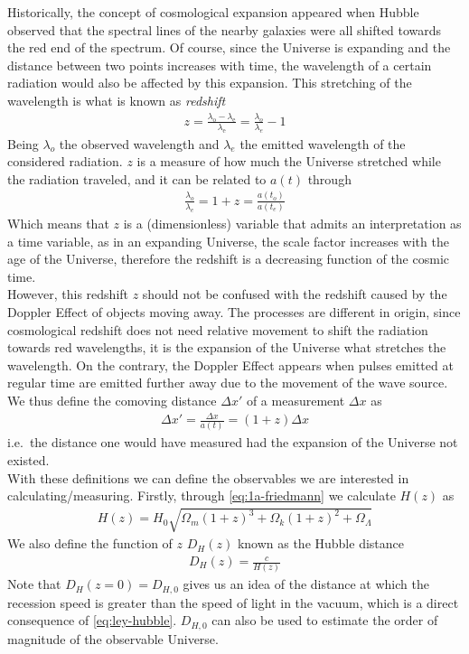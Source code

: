 Historically, the concept of cosmological expansion appeared when Hubble observed that the spectral lines of the nearby galaxies were all shifted towards the red end of the spectrum. Of course, since the Universe is expanding and the distance between two points increases with time, the wavelength of a certain radiation would also be affected by this expansion. This stretching of the wavelength is what is known as \textit{redshift} 
\begin{align}
	z = \frac{\lambda_{\text{o}} - \lambda_{\text{e}}}{\lambda_{\text{e}}} = \frac{\lambda_o}{\lambda_e} - 1
	\label{eq:redshift}
\end{align}
Being $\lambda_o$ the observed wavelength and $\lambda_e$ the emitted wavelength of the considered radiation. $z$ is a measure of how much the Universe stretched while the radiation traveled, and it can be related to $a(t)$ through 
\begin{align}
	\frac{\lambda_o}{\lambda_e} = 1+z = \frac{a(t_o)}{a(t_e)}
\end{align}
Which means that $z$ is a (dimensionless) variable that admits an interpretation as a time variable, as in an expanding Universe, the scale factor increases with the age of the Universe, therefore the redshift is a decreasing function of the cosmic time. \\

However, this redshift $z$ should not be confused with the redshift caused by the Doppler Effect of objects moving away. The processes are different in origin, since cosmological redshift does not need relative movement to shift the radiation towards red wavelengths, it is the expansion of the Universe what stretches the wavelength. On the contrary, the Doppler Effect appears when pulses emitted at regular time are emitted further away due to the movement of the wave source. \\

We thus define the comoving distance $\Delta x'$ of a measurement $\Delta x$ as 
\begin{align}
	\Delta x' =\frac{\Delta x}{a(t)}= (1+z)\Delta x
\end{align}
i.e.\ the distance one would have measured had the expansion of the Universe not existed. \\

With these definitions we can define  the observables we are interested in calculating/measuring. Firstly, through \eqref{eq:1a-friedmann} we calculate $H(z)$ as  
\begin{align}
	H(z) = H_0 \sqrt{\Omega_m(1+z)^3 + \Omega_k(1+z)^2 + \Omega_\Lambda} 
\end{align}
We also define the function of $z$ $D_H(z)$ known as the Hubble distance
\begin{align}
	D_H(z)  = \frac{c}{H(z)}
	\label{eq:DH-definition}
\end{align}
Note that $D_H(z=0) = D_{H,0}$ gives us an idea of the distance at which the recession speed is greater than the speed of light in the vacuum, which is a direct consequence of \eqref{eq:ley-hubble}. $D_{H,0}$ can also be used to estimate the order of magnitude of the observable Universe. \\

